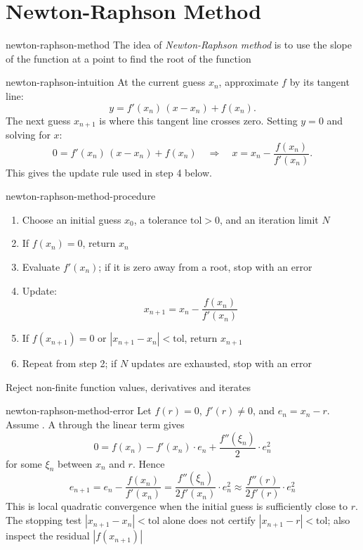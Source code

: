 \documentclass[12pt]{article}
\numberwithin{figure}{section}
\begin{document}
\section{Newton-Raphson Method} 

\begin{definition}{newton-raphson-method}
  The idea of \emph{Newton-Raphson method} is to use the slope of the function at a point to find the root of the function
\end{definition}

\begin{rem}{newton-raphson-intuition}
  At the current guess $x_n$, approximate $f$ by its tangent line:
  \[y = f'(x_n)\,(x - x_n) + f(x_n).\]
  The next guess $x_{n+1}$ is where this tangent line crosses zero. Setting $y = 0$ and solving for $x$:
  \[0 = f'(x_n)\,(x - x_n) + f(x_n) \quad\Longrightarrow\quad x = x_n - \frac{f(x_n)}{f'(x_n)}.\]
  This gives the update rule used in step 4 below.
\end{rem}

\begin{conv}{newton-raphson-method-procedure}
  \begin{enumerate}[nosep]
    \item Choose an initial guess $x_0$, a tolerance $\mathrm{tol}>0$, and an iteration limit $N$
    \item If $f(x_n)=0$, return $x_n$
    \item Evaluate $f'(x_n)$; if it is zero away from a root, stop with an error
    \item Update:
      \[x_{n+1} = x_n - \frac{f(x_n)}{f'(x_n)}\]
    \item If $f(x_{n+1})=0$ or $|x_{n+1}-x_n|<\mathrm{tol}$, return $x_{n+1}$
    \item Repeat from step 2; if $N$ updates are exhausted, stop with an error
  \end{enumerate}
  Reject non-finite function values, derivatives and iterates
\end{conv}

\begin{rem}{newton-raphson-method-error}
  Let $f(r)=0$, $f'(r)\ne0$, and $e_n=x_n-r$.
  Assume .
  A 
  through the linear term gives
  \[
    0=f(x_n)-f'(x_n)\cdot e_n
      +\frac{f''(\xi_n)}{2}\cdot e_n^2
  \]
  for some $\xi_n$ between $x_n$ and $r$. Hence
  \[
    e_{n+1}=e_n-\frac{f(x_n)}{f'(x_n)}
      =\frac{f''(\xi_n)}{2f'(x_n)}\cdot e_n^2
      \approx\frac{f''(r)}{2f'(r)}\cdot e_n^2
  \]
  This is local quadratic convergence when the initial guess is sufficiently
  close to $r$. The stopping test $|x_{n+1}-x_n|<\mathrm{tol}$ alone does not
  certify $|x_{n+1}-r|<\mathrm{tol}$; also inspect the residual $|f(x_{n+1})|$
\end{rem}
\end{document}
